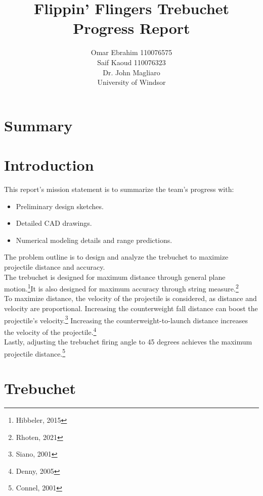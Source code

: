 \documentclass[12pt, titlepage]{article}
\title{Flippin' Flingers Trebuchet Progress Report}
\author{Omar Ebrahim 110076575\\Saif Kaoud 110076323\\[10pt] Dr. John Magliaro\\
University of Windsor}
\begin{document}
    \maketitle
    \section{Summary}
    \newpage
    \tableofcontents \newpage
    \listoffigures
    \listoftables \newpage
    \section{Introduction}
    This report's mission statement is to summarize the team's progress with:
    \begin{itemize}
        \item Preliminary design sketches.
        \item Detailed CAD drawings.
        \item Numerical modeling details and range predictions.
    \end{itemize}
    The problem outline is to design and analyze the trebuchet to maximize
    projectile distance and accuracy.\\[10pt]
    The trebuchet is designed for maximum distance through general
    plane motion.\footnote{Hibbeler, 2015}It is also designed for maximum 
    accuracy through string measure.\footnote{Rhoten, 2021}\\[10pt]
    To maximize distance, the velocity of the projectile is considered, as
    distance and velocity are proportional. Increasing the counterweight 
    fall distance can boost the projectile's velocity.\footnote{Siano, 2001}
    Increasing the counterweight-to-launch distance increases the velocity 
    of the projectile.\footnote{Denny, 2005}\\[10pt]
    Lastly, adjusting the trebuchet firing angle to 
    45 degrees achieves the maximum projectile distance.\footnote{Connel, 2001}
    \newpage
    \section{Trebuchet}
\end{document}
